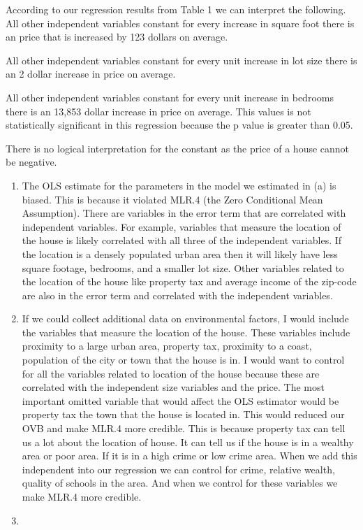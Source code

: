\documentclass[
  12pt,
  landscape]{article}
\begin{document}
According to our regression results from Table 1 we can interpret the
following. All other independent variables constant for every increase
in square foot there is an price that is increased by 123 dollars on
average.

All other independent variables constant for every unit increase in lot
size there is an 2 dollar increase in price on average.

All other independent variables constant for every unit increase in
bedrooms there is an 13,853 dollar increase in price on average. This
values is not statistically significant in this regression because the p
value is greater than 0.05.

There is no logical interpretation for the constant as the price of a
house cannot be negative.

\begin{enumerate}
\def\labelenumi{(\alph{enumi})}
\setcounter{enumi}{1}
\item
  The OLS estimate for the parameters in the model we estimated in (a)
  is biased. This is because it violated MLR.4 (the Zero Conditional
  Mean Assumption). There are variables in the error term that are
  correlated with independent variables. For example, variables that
  measure the location of the house is likely correlated with all three
  of the independent variables. If the location is a densely populated
  urban area then it will likely have less square footage, bedrooms, and
  a smaller lot size. Other variables related to the location of the
  house like property tax and average income of the zip-code are also in
  the error term and correlated with the independent variables.
\item
  If we could collect additional data on environmental factors, I would
  include the variables that measure the location of the house. These
  variables include proximity to a large urban area, property tax,
  proximity to a coast, population of the city or town that the house is
  in. I would want to control for all the variables related to location
  of the house because these are correlated with the independent size
  variables and the price. The most important omitted variable that
  would affect the OLS estimator would be property tax the town that the
  house is located in. This would reduced our OVB and make MLR.4 more
  credible. This is because property tax can tell us a lot about the
  location of house. It can tell us if the house is in a wealthy area or
  poor area. If it is in a high crime or low crime area. When we add
  this independent into our regression we can control for crime,
  relative wealth, quality of schools in the area. And when we control
  for these variables we make MLR.4 more credible.
\item
\end{enumerate}
\end{document}
